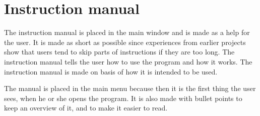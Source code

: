 \section{Instruction manual}
The instruction manual is placed in the main window and is made as a help for the user. It is made as short as possible since experiences from earlier projects show that users tend to skip parts of instructions if they are too long. The instruction manual tells the user how to use the program and how it works. The instruction manual is made on basis of how it is intended to be used.

The manual is placed in the main menu because then it is the first thing the user sees, when he or she opens the program. It is also made with bullet points to keep an overview of it, and to make it easier to read.